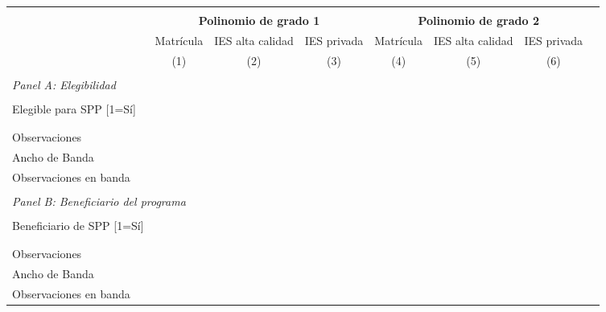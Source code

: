 \documentclass[a4paper]{article}
\begin{document}
\begin{itemize}
\begin{table}[H]
\small
    \centering
\begin{tabular}{lccc c ccc}
\hline \hline
\medskip \\
\cmidrule(lr){2-4} \cmidrule(lr){5-7}
                    &\multicolumn{3}{c}{\textbf{Polinomio de grado 1}}                &\multicolumn{3}{c}{\textbf{Polinomio de grado 2}}                \\
                    &  Matrícula         &IES alta calidad         & IES privada         &  Matrícula         &IES alta calidad         & IES privada         \\
 &\multicolumn{1}{c}{(1)}  &\multicolumn{1}{c}{(2)}  &\multicolumn{1}{c}{(3)}  &\multicolumn{1}{c}{(4)}  &\multicolumn{1}{c}{(5)}  &\multicolumn{1}{c}{(6)} \\
\cmidrule(lr){2-4} \cmidrule(lr){5-7}
\medskip \\
\multicolumn{6}{l}{\emph{Panel A: Elegibilidad}} & \\
\smallskip \\
Elegible para SPP [1=Sí]&  &      &   &       &      &       \\
                    &          &            &           &            &           &           \\
\smallskip \\
Observaciones       &             &               &              &             &               &              \\
Ancho de Banda      &               &                &                 &                 &                &                  \\
Observaciones en banda&             &               &             &               &              &             \\
\medskip \\
\multicolumn{6}{l}{\emph{Panel B: Beneficiario del programa}} & \\
\smallskip \\
Beneficiario de SPP [1=Sí]& &      &      &       &       &       \\
                    &              &              &             &              &             &              \\
\smallskip \\
Observaciones       &             &              &                &              &               &               \\
Ancho de Banda      &                  &                   &                   &                  &                   &                  \\
Observaciones en banda&                &               &                &             &             &              \\
\hline \hline
\end{tabular}
\end{table}


\end{itemize}
\end{document}
